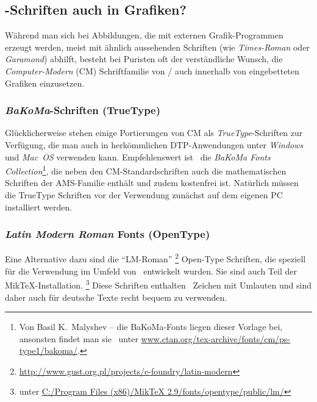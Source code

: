 \subsection{\tex-Schriften auch in Grafiken?}
\label{sec:tex-schriften-in-grafiken}

Während man sich bei Abbildungen, die mit externen
Grafik-Programmen erzeugt werden, meist mit ähnlich aussehenden
Schriften (wie \emph{Times-Roman} oder \emph{Garamond}) abhilft,
besteht bei Puristen oft der verständliche Wunsch, die 
\emph{Computer-Modern} (CM) Schriftfamilie von {\tex}/{\latex} auch
innerhalb von eingebetteten Grafiken einzusetzen.

\subsubsection{\emph{BaKoMa}-Schriften (TrueType)}

Glücklicherweise stehen einige Portierungen von CM als {\em
TrueType}-Schriften zur Verfügung, die man auch in herkömmlichen
DTP-Anwendungen unter \emph{Windows} und \emph{Mac~OS} verwenden
kann. Empfehlenswert ist \zB\ die \emph{BaKoMa Fonts
Collection}\footnote{Von Basil K.\ Malyshev -- die BaKoMa-Fonts
liegen dieser Vorlage bei, ansonsten findet man sie \zB\ unter
\url{www.ctan.org/tex-archive/fonts/cm/ps-type1/bakoma/}.}, die
neben den CM-Standardschriften auch die mathematischen Schriften
der AMS-Familie ent\-hält und zudem kostenfrei ist. Natürlich
müssen die TrueType Schriften vor der Verwendung zunächst auf dem
eigenen PC installiert werden. 

\subsubsection{\emph{Latin Modern Roman} Fonts (OpenType)}

Eine Alternative dazu sind die "`LM-Roman"'%
\footnote{\url{http://www.gust.org.pl/projects/e-foundry/latin-modern}}
 Open-Type Schriften, die speziell für die Verwendung im Umfeld von \latex\ entwickelt wurden.
Sie sind auch Teil der MikTeX-Installation.%
\footnote{\zB unter \url{C:/Program Files (x86)/MikTeX 2.9/fonts/opentype/public/lm/}}
Diese Schriften enthalten \ua\ Zeichen mit Umlauten und sind daher auch für deutsche Texte recht
bequem zu verwenden.

